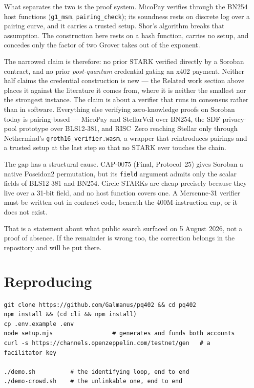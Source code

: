\documentclass[11pt,a4paper]{article}
\begin{document}
What separates the two is the proof system. MicoPay verifies through the BN254
host functions (\texttt{g1\_msm}, \texttt{pairing\_check}); its soundness rests
on discrete log over a pairing curve, and it carries a trusted setup. Shor's
algorithm breaks that assumption. The construction here rests on a hash
function, carries no setup, and concedes only the factor of two Grover takes
out of the exponent.

The narrowed claim is therefore: no prior STARK verified directly by a Soroban
contract, and no prior \emph{post-quantum} credential gating an x402 payment.
Neither half claims the credential construction is new --- the Related work
section above places it against the literature it comes from, where it is
neither the smallest nor the strongest instance. The claim is about a verifier
that runs in consensus rather than in software.
Everything else verifying zero-knowledge proofs on Soroban today is
pairing-based --- MicoPay and StellarVeil over BN254, the SDF privacy-pool
prototype over BLS12-381, and RISC~Zero reaching Stellar only through
Nethermind's \texttt{groth16\_verifier.wasm}, a wrapper that reintroduces
pairings and a trusted setup at the last step so that no STARK ever touches the
chain.

The gap has a structural cause. CAP-0075 (Final, Protocol~25) gives Soroban a
native Poseidon2 permutation, but its \texttt{field} argument admits only
the scalar fields of BLS12-381 and BN254. Circle STARKs are cheap
precisely because they live over a 31-bit field, and no host function covers
one. A Mersenne-31 verifier must be written out in contract code, beneath the
400M-instruction cap, or it does not exist.

That is a statement about what public search surfaced on 5 August 2026, not a
proof of absence. If the remainder is wrong too, the correction belongs in the
repository and will be put there.

\section{Reproducing}

\begin{lstlisting}
git clone https://github.com/Galmanus/pq402 && cd pq402
npm install && (cd cli && npm install)
cp .env.example .env
node setup.mjs                 # generates and funds both accounts
curl -s https://channels.openzeppelin.com/testnet/gen   # a facilitator key

./demo.sh          # the identifying loop, end to end
./demo-crowd.sh    # the unlinkable one, end to end
\end{lstlisting}
\end{document}
